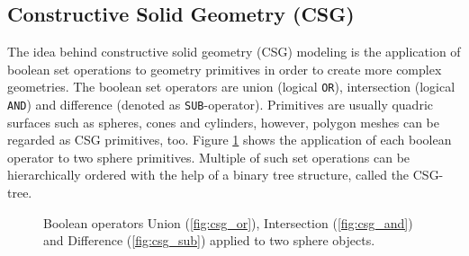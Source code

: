 \subsection{Constructive Solid Geometry (CSG)}

The idea behind constructive solid geometry (CSG) modeling is the application of boolean set operations to geometry primitives in order to create more complex geometries. The boolean set operators are union (logical \texttt{OR}), intersection (logical \texttt{AND}) and difference (denoted as \texttt{SUB}-operator). 
Primitives are usually quadric surfaces such as spheres, cones and cylinders, however, polygon meshes can be regarded as CSG primitives, too. Figure \ref{fig:csg} shows the application of each boolean operator to two sphere primitives. Multiple of such set operations can be hierarchically ordered with the help of a binary tree structure, called the CSG-tree.   

\begin{figure} 
	\centering
	\hfill
	\hfill
	\caption{Boolean operators Union (\ref{fig:csg_or}), Intersection (\ref{fig:csg_and}) and Difference (\ref{fig:csg_sub}) applied to two sphere objects.}
	\label{fig:csg}
\end{figure}

